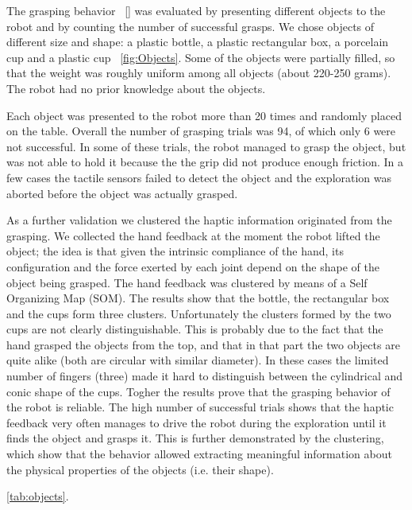 The grasping behavior ~\ref{} was evaluated by presenting different 
objects to the robot and by counting the number of successful grasps. 
We chose objects of different size and shape: 
a plastic bottle, a plastic rectangular box, a porcelain cup 
and a plastic cup ~\ref{fig:Objects}. Some of the objects were partially 
filled, so that the weight was roughly uniform among all objects (about 220-250 grams). 
The robot had no prior knowledge about the objects.

Each object was presented to the robot more than 20 times and randomly placed 
on the table. Overall the number of grasping trials was 94, of which only 
6 were not successful. In some of these 
trials, the robot managed to grasp the object, but was not able to hold it
because the the grip did not produce enough friction. In a few cases the 
tactile sensors failed to detect the object and the exploration was aborted 
before the object was actually grasped.

As a further validation we clustered the haptic information originated from 
the grasping. We collected the hand feedback at the moment the robot lifted the 
object; the idea is that given the intrinsic compliance of the hand, its 
configuration and the force exerted by each joint depend on the shape of the
object being grasped.
The hand feedback was clustered by means of a Self Organizing Map (SOM). The results 
show that the bottle, the rectangular box and the cups form three clusters. 
Unfortunately the clusters formed by the two cups are not clearly distinguishable. 
This is probably due to the fact that the hand grasped the objects from the
top, and that in that part the two objects are quite alike (both are circular with 
similar diameter). In these cases the limited number of fingers (three) 
made it hard to distinguish between the cylindrical and conic shape of the cups.
Togher the results prove that the grasping behavior of 
the robot is reliable. The high number of successful trials shows that the haptic 
feedback very often manages to drive the robot during the exploration until it 
finds the object and grasps it. This is further demonstrated by the clustering, 
which show that the behavior allowed extracting meaningful information about the 
physical properties of the objects (i.e. their shape). 

\ref{tab:objects}.

